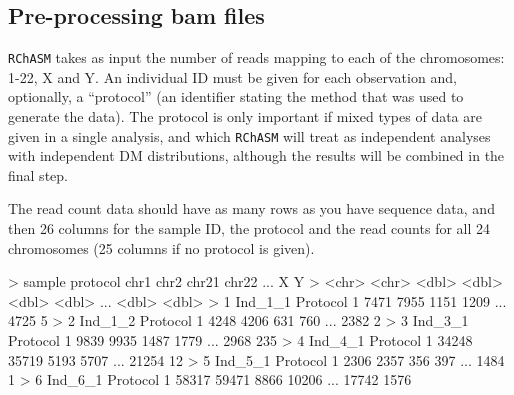 \documentclass[
  letterpaper,
  DIV=11,
  numbers=noendperiod]{scrartcl}
\newenvironment{Shaded}{\begin{snugshade}}{\end{snugshade}}
\newcommand{\DecValTok}[1]{\textcolor[rgb]{0.68,0.00,0.00}{#1}}
\newcommand{\ErrorTok}[1]{\textcolor[rgb]{0.68,0.00,0.00}{#1}}
\newcommand{\NormalTok}[1]{\textcolor[rgb]{0.00,0.23,0.31}{#1}}
\newcommand{\SpecialCharTok}[1]{\textcolor[rgb]{0.37,0.37,0.37}{#1}}
\begin{document}
\subsection{Pre-processing bam files}\label{pre-processing-bam-files}

\texttt{RChASM} takes as input the number of reads mapping to each of
the chromosomes: 1-22, X and Y. An individual ID must be given for each
observation and, optionally, a ``protocol'' (an identifier stating the
method that was used to generate the data). The protocol is only
important if mixed types of data are given in a single analysis, and
which \texttt{RChASM} will treat as independent analyses with
independent DM distributions, although the results will be combined in
the final step.

The read count data should have as many rows as you have sequence data,
and then 26 columns for the sample ID, the protocol and the read counts
for all 24 chromosomes (25 columns if no protocol is given).

\begin{Shaded}
\begin{Highlighting}[]
\SpecialCharTok{\textgreater{}}\NormalTok{   sample  protocol    chr1  chr2 chr21 chr22 ...     X     Y}
\SpecialCharTok{\textgreater{}}   \ErrorTok{\textless{}}\NormalTok{chr}\SpecialCharTok{\textgreater{}}   \ErrorTok{\textless{}}\NormalTok{chr}\SpecialCharTok{\textgreater{}}      \ErrorTok{\textless{}}\NormalTok{dbl}\SpecialCharTok{\textgreater{}} \ErrorTok{\textless{}}\NormalTok{dbl}\SpecialCharTok{\textgreater{}} \ErrorTok{\textless{}}\NormalTok{dbl}\SpecialCharTok{\textgreater{}} \ErrorTok{\textless{}}\NormalTok{dbl}\SpecialCharTok{\textgreater{}}\NormalTok{ ... }\SpecialCharTok{\textless{}}\NormalTok{dbl}\SpecialCharTok{\textgreater{}} \ErrorTok{\textless{}}\NormalTok{dbl}\SpecialCharTok{\textgreater{}}
\ErrorTok{\textgreater{}} \DecValTok{1}\NormalTok{ Ind\_1\_1 Protocol }\DecValTok{1}  \DecValTok{7471}  \DecValTok{7955}  \DecValTok{1151}  \DecValTok{1209}\NormalTok{ ...  }\DecValTok{4725}     \DecValTok{5}
\SpecialCharTok{\textgreater{}} \DecValTok{2}\NormalTok{ Ind\_1\_2 Protocol }\DecValTok{1}  \DecValTok{4248}  \DecValTok{4206}   \DecValTok{631}   \DecValTok{760}\NormalTok{ ...  }\DecValTok{2382}     \DecValTok{2}
\SpecialCharTok{\textgreater{}} \DecValTok{3}\NormalTok{ Ind\_3\_1 Protocol }\DecValTok{1}  \DecValTok{9839}  \DecValTok{9935}  \DecValTok{1487}  \DecValTok{1779}\NormalTok{ ...  }\DecValTok{2968}   \DecValTok{235}
\SpecialCharTok{\textgreater{}} \DecValTok{4}\NormalTok{ Ind\_4\_1 Protocol }\DecValTok{1} \DecValTok{34248} \DecValTok{35719}  \DecValTok{5193}  \DecValTok{5707}\NormalTok{ ... }\DecValTok{21254}    \DecValTok{12}
\SpecialCharTok{\textgreater{}} \DecValTok{5}\NormalTok{ Ind\_5\_1 Protocol }\DecValTok{1}  \DecValTok{2306}  \DecValTok{2357}   \DecValTok{356}   \DecValTok{397}\NormalTok{ ...  }\DecValTok{1484}     \DecValTok{1}
\SpecialCharTok{\textgreater{}} \DecValTok{6}\NormalTok{ Ind\_6\_1 Protocol }\DecValTok{1} \DecValTok{58317} \DecValTok{59471}  \DecValTok{8866} \DecValTok{10206}\NormalTok{ ... }\DecValTok{17742}  \DecValTok{1576}
\end{Highlighting}
\end{Shaded}
\end{document}
